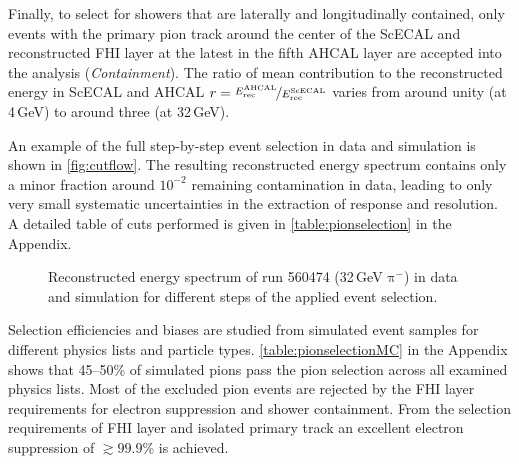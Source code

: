 \documentclass[twoside,a4paper,12pt]{article}
\newcommand\piminus{\(\mathrm{\pi^-}\)}
\begin{document}
Finally, to select for showers that are laterally and longitudinally contained, only events with the primary pion track around the center of the ScECAL and reconstructed FHI layer at the latest in the fifth AHCAL layer are accepted into the analysis (\emph{Containment}). The ratio of mean contribution to the reconstructed energy in ScECAL and AHCAL $r = \nicefrac{E_\text{rec}^\text{AHCAL}}{E_\text{rec}^\text{ScECAL}}$ varies from around unity (at 4\,GeV) to around three (at 32\,GeV). 

An example of the full step-by-step event selection in data and simulation is shown in \autoref{fig:cutflow}. The resulting reconstructed energy spectrum contains only a minor fraction around $10^{-2}$ remaining contamination in data, leading to only very small systematic uncertainties in the extraction of response and resolution. A detailed table of cuts performed is given in \autoref{table:pionselection} in the Appendix.

\begin{figure}[htbp]
	\hfill
	
	\caption{Reconstructed energy spectrum of run 560474 (32\,GeV \piminus) in data and simulation for different steps of the applied event selection.}
	\label{fig:cutflow}
\end{figure}

Selection efficiencies and biases are studied from simulated event samples for different physics lists and particle types. \autoref{table:pionselectionMC} in the Appendix shows that 45--50\% of simulated pions pass the pion selection across all examined physics lists. Most of the excluded pion events are rejected by the FHI layer requirements for electron suppression and shower containment. From the selection requirements of FHI layer and isolated primary track an excellent electron suppression of $\gtrsim99.9$\% is achieved.
\end{document}
